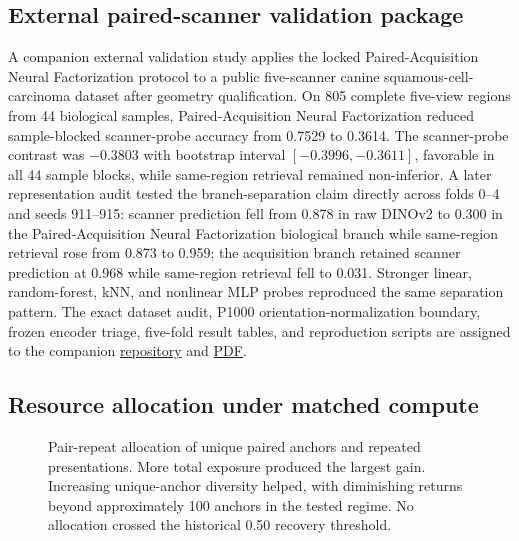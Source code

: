 \documentclass[10pt]{article}
\begin{document}
\subsection{External paired-scanner validation package}
A companion external validation study applies the locked Paired-Acquisition Neural Factorization protocol to a public five-scanner canine squamous-cell-carcinoma dataset after geometry qualification. On 805 complete five-view regions from 44 biological samples, Paired-Acquisition Neural Factorization reduced sample-blocked scanner-probe accuracy from 0.7529 to 0.3614. The scanner-probe contrast was $-0.3803$ with bootstrap interval $[-0.3996,-0.3611]$, favorable in all 44 sample blocks, while same-region retrieval remained non-inferior. A later representation audit tested the branch-separation claim directly across folds 0--4 and seeds 911--915: scanner prediction fell from 0.878 in raw DINOv2 to 0.300 in the Paired-Acquisition Neural Factorization biological branch while same-region retrieval rose from 0.873 to 0.959; the acquisition branch retained scanner prediction at 0.968 while same-region retrieval fell to 0.031. Stronger linear, random-forest, kNN, and nonlinear MLP probes reproduced the same separation pattern. The exact dataset audit, P1000 orientation-normalization boundary, frozen encoder triage, five-fold result tables, and reproduction scripts are assigned to the companion \href{https://github.com/matthewvaishnav/paired-acquisition-factorization-caninescc}{repository} and \href{https://matthewvaishnav.github.io/paired-acquisition-factorization-caninescc/paired-acquisition-factorization-caninescc.pdf}{PDF}.



\subsection{Resource allocation under matched compute}
\begin{figure}[t]
\centering
\resizebox{0.78\textwidth}{!}{}
\caption{Pair-repeat allocation of unique paired anchors and repeated presentations. More total exposure produced the largest gain. Increasing unique-anchor diversity helped, with diminishing returns beyond approximately 100 anchors in the tested regime. No allocation crossed the historical 0.50 recovery threshold.}
\label{fig:resource_allocation}
\end{figure}
\end{document}

